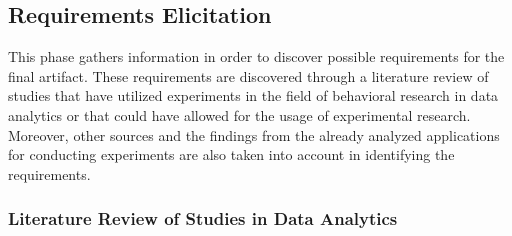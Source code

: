 

\subsection{Requirements Elicitation}

This phase gathers information in order to discover possible requirements for the final artifact. These requirements are discovered through a literature review of studies that have utilized experiments in the field of behavioral research in data analytics or that could have allowed for the usage of experimental research. Moreover, other sources and the findings from the already analyzed applications for conducting experiments are also taken into account in identifying the requirements.

\subsubsection{Literature Review of Studies in Data Analytics}\label{subsec:literature_review_requirements}

